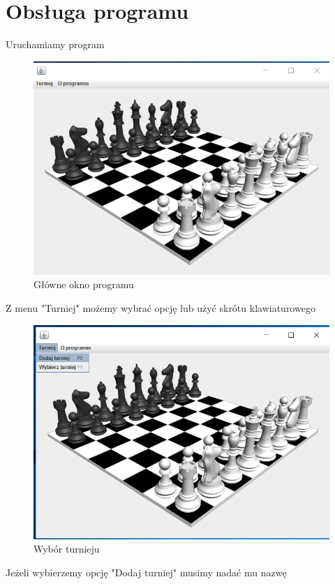 \chapter{Obsługa programu}
Uruchamiamy program
\begin{figure}[H]
	\centering
	\includegraphics[width=15cm]{fig/1}
	\caption{Główne okno programu}
	\label {fig:glowne_okno_programu} 
\end{figure}
Z menu "Turniej" możemy wybrać opcję lub użyć skrótu klawiaturowego
\begin{figure}[H]
	\centering
	\includegraphics[width=15cm]{fig/2}
	\caption{Wybór turnieju}
	\label {fig:wybor_turnieju} 
\end{figure}
Jeżeli wybierzemy opcję "Dodaj turniej" musimy nadać mu nazwę
